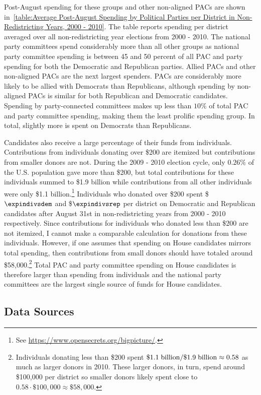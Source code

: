 \documentclass[12pt,final,fleqn]{article}
\theoremstyle{plain}
\begin{document}
Post-August spending for these groups and other non-aligned PACs are shown in~\autoref{table:Average Post-August Spending by Political Parties per District in Non-Redistricting Years, 2000 - 2010}. The table reports spending per district averaged over all non-redistricting year elections from 2000 - 2010. The national party committees spend considerably more than all other groups as national party committee spending is between 45 and 50 percent of all PAC and party spending for both the Democratic and Republican parties. Allied PACs and other non-aligned PACs are the next largest spenders. PACs are considerably more likely to be allied with Democrats than Republicans, although spending by non-aligned PACs is similar for both Republican and Democratic candidates. Spending by party-connected committees makes up less than $10\%$ of total PAC and party committee spending, making them the least prolific spending group. In total, slightly more is spent on Democrats than Republicans.

Candidates also receive a large percentage of their funds from individuals. Contributions from individuals donating over \$200 are itemized but contributions from smaller donors are not. During the 2009 - 2010 election cycle, only $0.26\%$ of the U.S. population gave more than \$200, but total contributions for these individuals summed to \$1.9 billion while contributions from all other individuals were only \$1.1 billion.\footnote{See \url{https://www.opensecrets.org/bigpicture/}.} Individuals who donated over \$200 spent \$$\expindivsdem$ and \$$\expindivsrep$ per district on Democratic and Republican candidates after August 31st in non-redistricting years from 2000 - 2010 respectively. Since contributions for individuals who donated less than \$200 are not itemized, I cannot make a comparable calculation for donations from these individuals. However, if one assumes that spending on House candidates mirrors total spending, then contributions from small donors should have totaled around \$58,000.\footnote{Individuals donating less than \$200 spent $\$1.1\; \rm{billion}/\$1.9\; \rm{billion} \approx 0.58$ as much as larger donors in 2010. These larger donors, in turn, spend around \$100,000 per district so smaller donors likely spent close to $0.58 \cdot \$100,000 \approx \$58,000$.} Total PAC and party committee spending on House candidates is therefore larger than spending from individuals and the national party committees are the largest single source of funds for House candidates.

\subsection{Data Sources}\label{sec:data sources}
\end{document}
